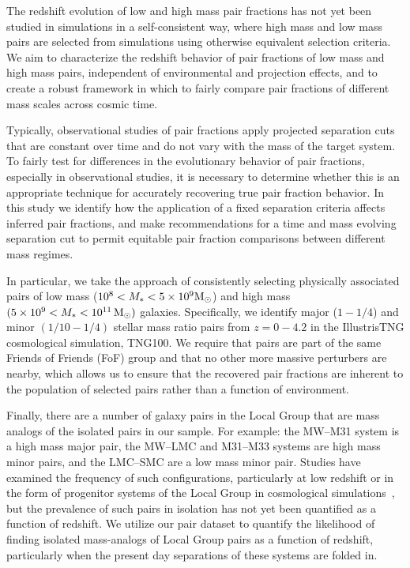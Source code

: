 \documentclass[twocolumn]{aastex631}
\begin{document}
    The redshift evolution of low and high mass pair fractions has not yet been studied in simulations in a self-consistent way, where high mass and low mass pairs are selected from simulations using otherwise equivalent selection criteria. 
    We aim to characterize the redshift behavior of pair fractions of low mass and high mass pairs, independent of environmental and projection effects, and to create a robust framework in which to fairly compare pair fractions of different mass scales across cosmic time. 

    Typically, observational studies of pair fractions apply projected separation cuts that are constant over time and do not vary with the mass of the target system. 
    To fairly test for differences in the evolutionary behavior of pair fractions, especially in observational studies, it is necessary to determine whether this is an appropriate technique for accurately recovering true pair fraction behavior.
    In this study we identify how the application of a fixed separation criteria affects inferred pair fractions, and make recommendations for a time and mass evolving separation cut to permit equitable pair fraction comparisons between different mass regimes.

    In particular, we take the approach of consistently selecting physically associated pairs of low mass ($10^8<M_*<5\times10^9\mathrm{M}_\odot$) and high mass $(5\times10^9<M_*<10^{11}\,\mathrm{M}_\odot)$ galaxies. 
    Specifically, we identify major ($1-1/4$) and minor $(1/10-1/4)$ stellar mass ratio pairs from $z=0-4.2$ in the IllustrisTNG cosmological simulation, TNG100. 
    We require that pairs are part of the same Friends of Friends (FoF) group and that no other more massive perturbers are nearby, which allows us to ensure that the recovered pair fractions are inherent to the population of selected pairs rather than a function of environment. 

    Finally, there are a number of galaxy pairs in the Local Group that are mass analogs of the isolated pairs in our sample.
    For example: the MW--M31 system is a high mass major pair, the MW--LMC and M31--M33 systems are high mass minor pairs, and the LMC--SMC are a low mass minor pair.
    Studies have examined the frequency of such configurations, particularly at low redshift or in the form of progenitor systems of the Local Group in cosmological simulations~\citep{Bk2011,Fattahi2013,Patel2017a-Orbits,Geha2017,Mao2021}, but the prevalence of such pairs in isolation has not yet been quantified as a function of redshift. 
    We utilize our pair dataset to quantify the likelihood of finding isolated mass-analogs of Local Group pairs as a function of redshift, particularly when the present day separations of these systems are folded in. 
    
\end{document}
